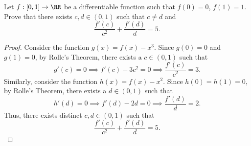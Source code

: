 %

\begin{problem}
    Let $f: [0,1] \to \RR$ be a differentiable function such that $f(0) = 0$, $f(1) = 1$. Prove that there exists $c, d \in (0, 1)$ such that $c \neq d$ and \[\frac{f'(c)}{c^2} + \frac{f'(d)}{d} = 5.\]
\end{problem}
\begin{proof}
    Consider the function $g(x) = f(x) - x^3$. Since $g(0) = 0$ and $g(1) = 0$, by Rolle's Theorem, there exists a $c \in (0, 1)$ such that \[g'(c) = 0 \implies f'(c) - 3c^2 = 0 \implies \frac{f'(c)}{c^2} = 3.\] Similarly, consider the function $h(x) = f(x) - x^2$. Since $h(0) = h(1) = 0$, by Rolle's Theorem, there exists a $d \in (0, 1)$ such that \[h'(d) = 0 \implies f'(d) - 2d = 0 \implies \frac{f'(d)}{d} = 2.\] Thus, there exists distinct $c, d \in (0, 1)$ such that \[\frac{f'(c)}{c^2} + \frac{f'(d)}{d} = 5.\]
\end{proof}